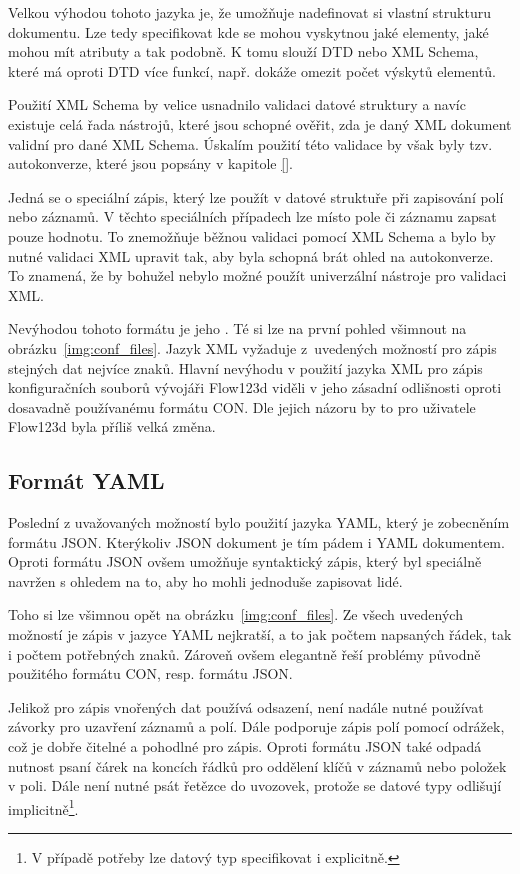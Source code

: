 \documentclass[FM,bw,DP]{tulthesis}
\begin{document}
Velkou výhodou tohoto jazyka je, že umožňuje nadefinovat si vlastní strukturu dokumentu. Lze tedy specifikovat kde se mohou vyskytnou jaké elementy, jaké mohou mít atributy a tak podobně. K tomu slouží DTD nebo XML Schema, které má oproti DTD více funkcí, např. dokáže omezit počet výskytů elementů.

Použití XML Schema by velice usnadnilo validaci datové struktury a navíc existuje celá řada nástrojů, které jsou schopné ověřit, zda je daný XML dokument validní pro dané XML Schema. Úskalím použití této validace by však byly tzv. autokonverze, které jsou popsány v kapitole \ref{}.

Jedná se o speciální zápis, který lze použít v datové struktuře při zapisování polí nebo záznamů. V těchto speciálních případech lze místo pole či záznamu zapsat pouze hodnotu. To znemožňuje běžnou validaci pomocí XML Schema a bylo by nutné validaci XML upravit tak, aby byla schopná brát ohled na autokonverze. To znamená, že by bohužel nebylo možné použít univerzální nástroje pro validaci XML.

Nevýhodou tohoto formátu je jeho . Té si lze na první pohled všimnout na obrázku~\ref{img:conf_files}. Jazyk XML vyžaduje z~uvedených možností pro zápis stejných dat nejvíce znaků. Hlavní nevýhodu v použití jazyka XML pro zápis konfiguračních souborů vývojáři Flow123d viděli v jeho zásadní odlišnosti oproti dosavadně po\-u\-ží\-va\-né\-mu formátu CON. Dle jejich názoru by to pro uživatele Flow123d byla příliš velká změna.

\subsection{Formát YAML}
\label{sec:problematika-format-yaml}

Poslední z uvažovaných možností bylo použití jazyka YAML, který je zobecněním formátu JSON. Kterýkoliv JSON dokument je tím pádem i YAML dokumentem. Oproti formátu JSON ovšem umožňuje syntaktický zápis, který byl speciálně navržen s ohledem na to, aby ho mohli jednoduše zapisovat lidé.

Toho si lze všimnou opět na obrázku~\ref{img:conf_files}. Ze všech uvedených možností je zápis v jazyce YAML nejkratší, a to jak počtem napsaných řádek, tak i počtem potřebných znaků. Zároveň ovšem elegantně řeší problémy původně použitého formátu CON, resp. formátu JSON.

Jelikož pro zápis vnořených dat používá odsazení, není nadále nutné používat závorky pro uzavření záznamů a polí. Dále podporuje zápis polí pomocí odrážek, což je dobře čitelné a pohodlné pro zápis. Oproti formátu JSON také odpadá nutnost psaní čárek na koncích řádků pro oddělení klíčů v záznamů nebo položek v poli. Dále není nutné psát řetězce do uvozovek, protože se datové typy odlišují implicitně\footnote{V případě potřeby lze datový typ specifikovat i explicitně.}.
\end{document}
